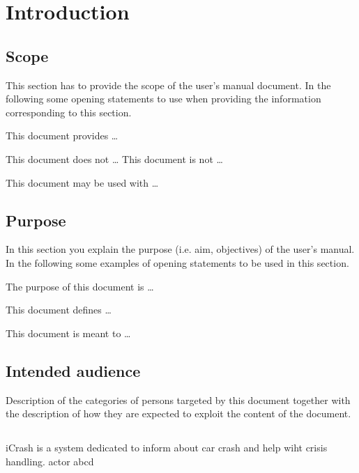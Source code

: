 \chapter{Introduction}
\label{chap:introduction}

\section{Scope}
This section has to provide the scope of the user's manual document.
In the following some opening statements to use when providing the
information corresponding to this section.

This document provides \ldots


This document does not \ldots 
This document is not \ldots 

 
This document may be used with \ldots




\section{Purpose}
In this section you explain the purpose (i.e. aim, objectives) of the user's
manual. In the following some examples of opening statements to be used in this
section.

The purpose of this document is \ldots

This document defines \ldots

This document is meant to \ldots



\section{Intended audience}
Description of the categories of persons targeted by this document together with
the description of how they are expected to exploit the content of the document.


\section{\mysystemname}
iCrash is a system dedicated to inform about car crash and help wiht crisis
handling. \gls{actor} abcd 


